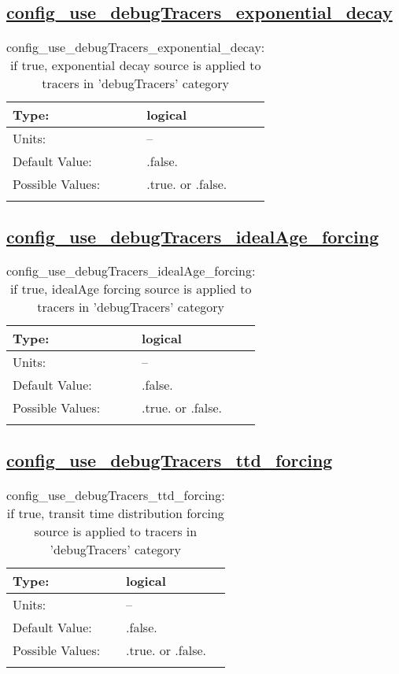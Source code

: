 \subsection[config\_use\_debugTracers\_exponential\_decay]{\hyperref[sec:nm_tab_tracer_forcing_debugTracers]{config\_use\_debugTracers\_exponential\_decay}}
\label{subsec:nm_sec_config_use_debugTracers_exponential_decay}
\begin{center}
\begin{longtable}{| p{2.0in} || p{4.0in} |}
    \hline
    Type: & logical \\
    \hline
    Units: & -- \\
    \hline
    Default Value: & .false. \\
    \hline
    Possible Values: & .true. or .false. \\
    \hline
    \caption{config\_use\_debugTracers\_exponential\_decay: if true, exponential decay source is applied to tracers in 'debugTracers' category}
\end{longtable}
\end{center}
\subsection[config\_use\_debugTracers\_idealAge\_forcing]{\hyperref[sec:nm_tab_tracer_forcing_debugTracers]{config\_use\_debugTracers\_idealAge\_forcing}}
\label{subsec:nm_sec_config_use_debugTracers_idealAge_forcing}
\begin{center}
\begin{longtable}{| p{2.0in} || p{4.0in} |}
    \hline
    Type: & logical \\
    \hline
    Units: & -- \\
    \hline
    Default Value: & .false. \\
    \hline
    Possible Values: & .true. or .false. \\
    \hline
    \caption{config\_use\_debugTracers\_idealAge\_forcing: if true, idealAge forcing source is applied to tracers in 'debugTracers' category}
\end{longtable}
\end{center}
\subsection[config\_use\_debugTracers\_ttd\_forcing]{\hyperref[sec:nm_tab_tracer_forcing_debugTracers]{config\_use\_debugTracers\_ttd\_forcing}}
\label{subsec:nm_sec_config_use_debugTracers_ttd_forcing}
\begin{center}
\begin{longtable}{| p{2.0in} || p{4.0in} |}
    \hline
    Type: & logical \\
    \hline
    Units: & -- \\
    \hline
    Default Value: & .false. \\
    \hline
    Possible Values: & .true. or .false. \\
    \hline
    \caption{config\_use\_debugTracers\_ttd\_forcing: if true, transit time distribution forcing source is applied to tracers in 'debugTracers' category}
\end{longtable}
\end{center}
